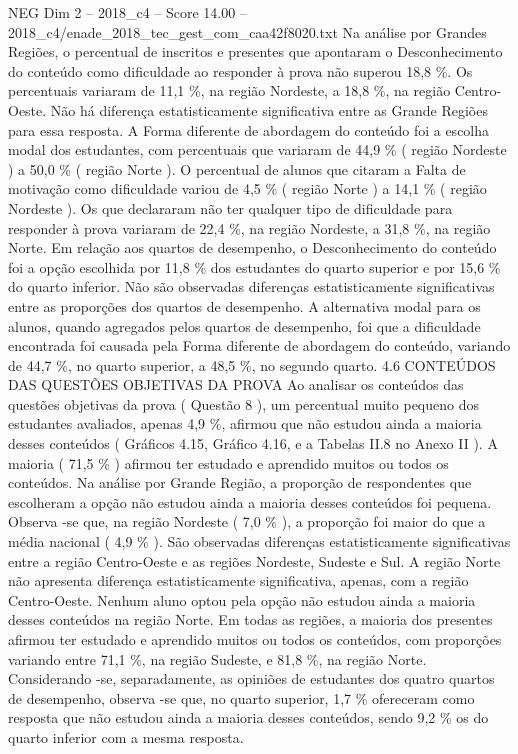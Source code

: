 \begin{textsample}{NEG Dim 2 – 2018\_c4 – Score 14.00 – 2018\_c4/enade\_2018\_tec\_gest\_com\_caa42f8020.txt}
Na análise por Grandes Regiões, o percentual de inscritos e presentes que apontaram o Desconhecimento do conteúdo como dificuldade ao responder à prova não superou 18,8 \%.
Os percentuais variaram de 11,1 \%, na região Nordeste, a 18,8 \%, na região Centro-Oeste.
Não há diferença estatisticamente significativa entre as Grande Regiões para essa resposta.
A Forma diferente de abordagem do conteúdo foi a escolha modal dos estudantes, com percentuais que variaram de 44,9 \% ( região Nordeste ) a 50,0 \% ( região Norte ).
O percentual de alunos que citaram a Falta de motivação como dificuldade variou de 4,5 \% ( região Norte ) a 14,1 \% ( região Nordeste ).
Os que declararam não ter qualquer tipo de dificuldade para responder à prova variaram de 22,4 \%, na região Nordeste, a 31,8 \%, na região Norte.
Em relação aos quartos de desempenho, o Desconhecimento do conteúdo foi a opção escolhida por 11,8 \% dos estudantes do quarto superior e por 15,6 \% do quarto inferior.
Não são observadas diferenças estatisticamente significativas entre as proporções dos quartos de desempenho.
A alternativa modal para os alunos, quando agregados pelos quartos de desempenho, foi que a dificuldade encontrada foi causada pela Forma diferente de abordagem do conteúdo, variando de 44,7 \%, no quarto superior, a 48,5 \%, no segundo quarto. 4.6 CONTEÚDOS DAS QUESTÕES OBJETIVAS DA PROVA Ao analisar os conteúdos das questões objetivas da prova ( Questão 8 ), um percentual muito pequeno dos estudantes avaliados, apenas 4,9 \%, afirmou que não estudou ainda a maioria desses conteúdos ( Gráficos 4.15, Gráfico 4.16, e a Tabelas II.8 no Anexo II ).
A maioria ( 71,5 \% ) afirmou ter estudado e aprendido muitos ou todos os conteúdos.
Na análise por Grande Região, a proporção de respondentes que escolheram a opção não estudou ainda a maioria desses conteúdos foi pequena.
Observa -se que, na região Nordeste ( 7,0 \% ), a proporção foi maior do que a média nacional ( 4,9 \% ).
São observadas diferenças estatisticamente significativas entre a região Centro-Oeste e as regiões Nordeste, Sudeste e Sul.
A região Norte não apresenta diferença estatisticamente significativa, apenas, com a região Centro-Oeste.
Nenhum aluno optou pela opção não estudou ainda a maioria desses conteúdos na região Norte.
Em todas as regiões, a maioria dos presentes afirmou ter estudado e aprendido muitos ou todos os conteúdos, com proporções variando entre 71,1 \%, na região Sudeste, e 81,8 \%, na região Norte.
Considerando -se, separadamente, as opiniões de estudantes dos quatro quartos de desempenho, observa -se que, no quarto superior, 1,7 \% ofereceram como resposta que não estudou ainda a maioria desses conteúdos, sendo 9,2 \% os do quarto inferior com a mesma resposta.

\end{textsample}

